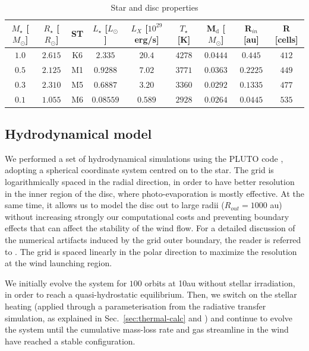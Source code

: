 \documentclass{aa}
\begin{document}
\begin{table}
\caption{Star and disc properties}
\label{tab:stars}
\centering
\begin{tabular}{c c c c c c c c c}
\hline
$M_\star$ [$M_\odot$] & $R_\star$ [$R_\odot$] & ST & $L_\star$ [$L_\odot$] & $L_X$ [$10^{29}$ erg/s] & $T_\star$ [K] & M$_\mathrm{d}$ [$M_\odot$] & R$_{in}$ [au] & R [cells]\\
\hline
\hline
   $1.0$ & $2.615$ & K6 & $2.335$ & $20.4$ & $4278$ & $0.0444$ & $0.445$ & $412$\\
   $0.5$ & $2.125$ & M1 & $0.9288$ & $7.02$ & $3771$ & $0.0363$ & $0.2225$ & $449$\\
   $0.3$ & $2.310$ & M5 & $0.6887$ & $3.20$ & $3360$ & $0.0292$ & $0.1335$ & $477$\\
   $0.1$ & $1.055$ & M6 & $0.08559$ & $0.589$ & $2928$ & $0.0264$ & $0.0445$ & $535$\\
\hline
\end{tabular}
\end{table}

\subsection{Hydrodynamical model}\label{sec:hydro-model}

We performed a set of hydrodynamical simulations using the \textsc{PLUTO} code , adopting a spherical coordinate system centred on to the star.
The grid is logarithmically spaced in the radial direction, in order to have better resolution in the inner region of the disc, where photo-evaporation is mostly effective.
At the same time, it allows us to model the disc out to large radii ($R_{out}= 1000$ au) without increasing strongly our computational costs and preventing boundary effects that can affect the stability of the wind flow.
For a detailed discussion of the numerical artifacts induced by the grid outer boundary, the reader is referred to .
The grid is spaced linearly in the polar direction to maximize the resolution at the wind launching region.

We initially evolve the system for $100$ orbits at \si{10}{au} without stellar irradiation, in order to reach a quasi-hydrostatic equilibrium.
Then, we switch on the stellar heating (applied through a parameterisation from the radiative transfer simulation, as explained in Sec.~\ref{sec:thermal-calc} and ) and continue to evolve the system until the cumulative mass-loss rate and gas streamline in the wind have reached a stable configuration.
\end{document}
